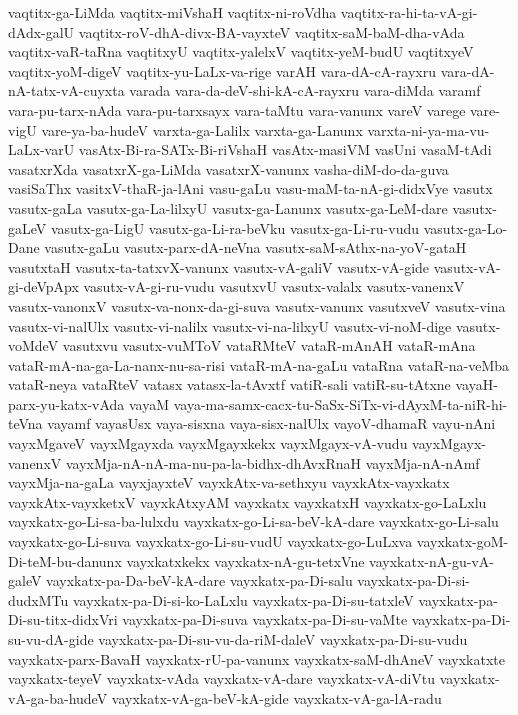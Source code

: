 {vaqtitx-ga-LiMda
vaqtitx-miVshaH
vaqtitx-ni-roVdha
vaqtitx-ra-hi-ta-vA-gi-dAdx-galU
vaqtitx-roV-dhA-divx-BA-vayxteV
vaqtitx-saM-baM-dha-vAda
vaqtitx-vaR-taRna
vaqtitxyU
vaqtitx-yalelxV
vaqtitx-yeM-budU
vaqtitxyeV
vaqtitx-yoM-digeV
vaqtitx-yu-LaLx-va-rige
varAH
vara-dA-cA-rayxru
vara-dA-nA-tatx-vA-cuyxta
varada
vara-da-deV-shi-kA-cA-rayxru
vara-diMda
varamf
vara-pu-tarx-nAda
vara-pu-tarxsayx
vara-taMtu
vara-vanunx
vareV
varege
vare-vigU
vare-ya-ba-hudeV
varxta-ga-Lalilx
varxta-ga-Lanunx
varxta-ni-ya-ma-vu-LaLx-varU
vasAtx-Bi-ra-SATx-Bi-riVshaH
vasAtx-masiVM
vasUni
vasaM-tAdi
vasatxrXda
vasatxrX-ga-LiMda
vasatxrX-vanunx
vasha-diM-do-da-guva
vasiSaThx
vasitxV-thaR-ja-lAni
vasu-gaLu
vasu-maM-ta-nA-gi-didxVye
vasutx
vasutx-gaLa
vasutx-ga-La-lilxyU
vasutx-ga-Lanunx
vasutx-ga-LeM-dare
vasutx-gaLeV
vasutx-ga-LigU
vasutx-ga-Li-ra-beVku
vasutx-ga-Li-ru-vudu
vasutx-ga-Lo-Dane
vasutx-gaLu
vasutx-parx-dA-neVna
vasutx-saM-sAthx-na-yoV-gataH
vasutxtaH
vasutx-ta-tatxvX-vanunx
vasutx-vA-galiV
vasutx-vA-gide
vasutx-vA-gi-deVpApx
vasutx-vA-gi-ru-vudu
vasutxvU
vasutx-valalx
vasutx-vanenxV
vasutx-vanonxV
vasutx-va-nonx-da-gi-suva
vasutx-vanunx
vasutxveV
vasutx-vina
vasutx-vi-nalUlx
vasutx-vi-nalilx
vasutx-vi-na-lilxyU
vasutx-vi-noM-dige
vasutx-voMdeV
vasutxvu
vasutx-vuMToV
vataRMteV
vataR-mAnAH
vataR-mAna
vataR-mA-na-ga-La-nanx-nu-sa-risi
vataR-mA-na-gaLu
vataRna
vataR-na-veMba
vataR-neya
vataRteV
vatasx
vatasx-la-tAvxtf
vatiR-sali
vatiR-su-tAtxne
vayaH-parx-yu-katx-vAda
vayaM
vaya-ma-samx-cacx-tu-SaSx-SiTx-vi-dAyxM-ta-niR-hi-teVna
vayamf
vayasUsx
vaya-sisxna
vaya-sisx-nalUlx
vayoV-dhamaR
vayu-nAni
vayxMgaveV
vayxMgayxda
vayxMgayxkekx
vayxMgayx-vA-vudu
vayxMgayx-vanenxV
vayxMja-nA-nA-ma-nu-pa-la-bidhx-dhAvxRnaH
vayxMja-nA-nAmf
vayxMja-na-gaLa
vayxjayxteV
vayxkAtx-va-sethxyu
vayxkAtx-vayxkatx
vayxkAtx-vayxketxV
vayxkAtxyAM
vayxkatx
vayxkatxH
vayxkatx-go-LaLxlu
vayxkatx-go-Li-sa-ba-lulxdu
vayxkatx-go-Li-sa-beV-kA-dare
vayxkatx-go-Li-salu
vayxkatx-go-Li-suva
vayxkatx-go-Li-su-vudU
vayxkatx-go-LuLxva
vayxkatx-goM-Di-teM-bu-danunx
vayxkatxkekx
vayxkatx-nA-gu-tetxVne
vayxkatx-nA-gu-vA-galeV
vayxkatx-pa-Da-beV-kA-dare
vayxkatx-pa-Di-salu
vayxkatx-pa-Di-si-dudxMTu
vayxkatx-pa-Di-si-ko-LaLxlu
vayxkatx-pa-Di-su-tatxleV
vayxkatx-pa-Di-su-titx-didxVri
vayxkatx-pa-Di-suva
vayxkatx-pa-Di-su-vaMte
vayxkatx-pa-Di-su-vu-dA-gide
vayxkatx-pa-Di-su-vu-da-riM-daleV
vayxkatx-pa-Di-su-vudu
vayxkatx-parx-BavaH
vayxkatx-rU-pa-vanunx
vayxkatx-saM-dhAneV
vayxkatxte
vayxkatx-teyeV
vayxkatx-vAda
vayxkatx-vA-dare
vayxkatx-vA-diVtu
vayxkatx-vA-ga-ba-hudeV
vayxkatx-vA-ga-beV-kA-gide
vayxkatx-vA-ga-lA-radu
}
